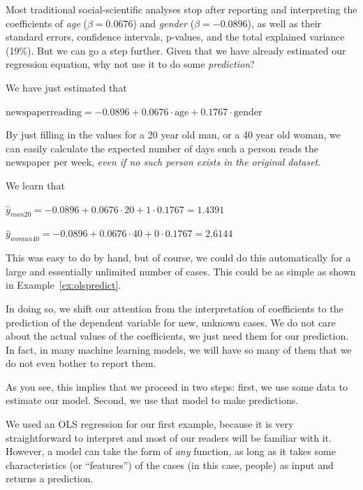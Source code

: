 
Most traditional social-scientific analyses stop after reporting and
interpreting the coefficients of \emph{age} ($\beta = 0.0676$) and \emph{gender} ($\beta = -0.0896$), as well as their standard errors, confidence intervals, p-values, and the total explained variance (19\%).
But we can go a step further. Given that we have already estimated our
regression equation, why not use it to do some \textit{prediction}?

We have just estimated that

$\textrm{newspaperreading} = -0.0896 + 0.0676 \cdot \textrm{age} + 0.1767 \cdot \textrm{gender}$

By just filling in the values for a 20 year old man, or a 40 year old
woman, we can easily calculate the expected number of days such a
person reads the newspaper per week, \emph{even if no such person
  exists in the original dataset}.

We learn that

$\hat{y}_{man20} = -0.0896 + 0.0676 \cdot 20 + 1 \cdot 0.1767 = 1.4391$

$\hat{y}_{woman40} = -0.0896 + 0.0676 \cdot 40 + 0 \cdot 0.1767 = 2.6144$

This was easy to do by hand, but of course, we could do this automatically for a large and essentially unlimited number of cases.
This could be as simple as shown in Example~\ref{ex:olspredict}.


In doing so, we shift our attention from the interpretation of coefficients to the prediction of the dependent variable for new, unknown cases. We do not
care about the actual values of the coefficients, we just need them for our prediction.
In fact, in many machine learning models, we will have so many of them that
we do not even bother to report them.

As you see, this implies that we proceed in two steps: first, we use some data
to estimate our model. Second, we use that model to make predictions.

We used an OLS regression for our first example, because it is very
straightforward to interpret and most of our readers will be familiar
with it.  However, a model can take the form of \emph{any} function,
as long as it takes some characteristics (or ``features'') of the
cases (in this case, people) as input and returns a prediction.

